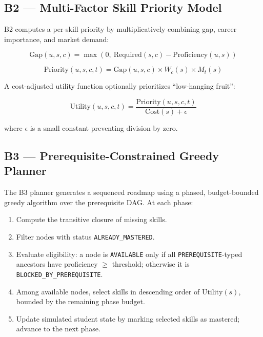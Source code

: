 \documentclass[conference]{IEEEtran}
\begin{document}
\subsection{B2 --- Multi-Factor Skill Priority Model}

B2 computes a per-skill priority by multiplicatively combining gap, career importance, and market demand:

\begin{equation}
\text{Gap}(u,s,c) = \max\!\left(0,\ \text{Required}(s,c) - \text{Proficiency}(u,s)\right)
\label{eq:gap}
\end{equation}

\begin{equation}
\text{Priority}(u,s,c,t) = \text{Gap}(u,s,c) \times W_c(s) \times M_t(s)
\label{eq:priority}
\end{equation}

A cost-adjusted utility function optionally prioritizes ``low-hanging fruit'':

\begin{equation}
\text{Utility}(u,s,c,t) = \frac{\text{Priority}(u,s,c,t)}{\text{Cost}(s) + \epsilon}
\label{eq:utility}
\end{equation}

\noindent where $\epsilon$ is a small constant preventing division by zero.

\subsection{B3 --- Prerequisite-Constrained Greedy Planner}

The B3 planner generates a sequenced roadmap using a phased, budget-bounded greedy algorithm over the prerequisite DAG. At each phase:

\begin{enumerate}
    \item Compute the transitive closure of missing skills.
    \item Filter nodes with status \texttt{ALREADY\_MASTERED}.
    \item Evaluate eligibility: a node is \texttt{AVAILABLE} only if all \texttt{PREREQUISITE}-typed ancestors have proficiency $\geq$ threshold; otherwise it is \texttt{BLOCKED\_BY\_PREREQUISITE}.
    \item Among available nodes, select skills in descending order of $\text{Utility}(s)$, bounded by the remaining phase budget.
    \item Update simulated student state by marking selected skills as mastered; advance to the next phase.
\end{enumerate}
\end{document}
